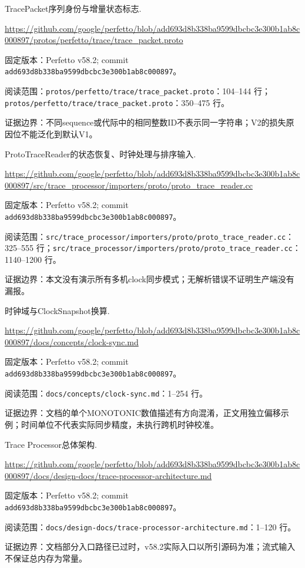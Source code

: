 \documentclass[UTF8,fontset=fandol,openany,11pt]{ctexbook}
\begin{document}
\begin{thebibliography}{999}
 TracePacket序列身份与增量状态标志.\par
\url{https://github.com/google/perfetto/blob/add693d8b338ba9599dbcbc3e300b1ab8c000897/protos/perfetto/trace/trace_packet.proto}\par
{\small\raggedright 固定版本：Perfetto v58.2; commit \texttt{add693d8\allowbreak{}b338ba95\allowbreak{}99dbcbc3\allowbreak{}e300b1ab\allowbreak{}8c000897}。\par
阅读范围：\nolinkurl{protos/perfetto/trace/trace_packet.proto}：104–144 行；\nolinkurl{protos/perfetto/trace/trace_packet.proto}：350–475 行。\par
证据边界：不同sequence或代际中的相同整数ID不表示同一字符串；V2的损失原因位不能泛化到默认V1。
}

 ProtoTraceReader的状态恢复、时钟处理与排序输入.\par
\url{https://github.com/google/perfetto/blob/add693d8b338ba9599dbcbc3e300b1ab8c000897/src/trace_processor/importers/proto/proto_trace_reader.cc}\par
{\small\raggedright 固定版本：Perfetto v58.2; commit \texttt{add693d8\allowbreak{}b338ba95\allowbreak{}99dbcbc3\allowbreak{}e300b1ab\allowbreak{}8c000897}。\par
阅读范围：\nolinkurl{src/trace_processor/importers/proto/proto_trace_reader.cc}：325–555 行；\nolinkurl{src/trace_processor/importers/proto/proto_trace_reader.cc}：1140–1200 行。\par
证据边界：本文没有演示所有多机clock同步模式；无解析错误不证明生产端没有漏报。
}

 时钟域与ClockSnapshot换算.\par
\url{https://github.com/google/perfetto/blob/add693d8b338ba9599dbcbc3e300b1ab8c000897/docs/concepts/clock-sync.md}\par
{\small\raggedright 固定版本：Perfetto v58.2; commit \texttt{add693d8\allowbreak{}b338ba95\allowbreak{}99dbcbc3\allowbreak{}e300b1ab\allowbreak{}8c000897}。\par
阅读范围：\nolinkurl{docs/concepts/clock-sync.md}：1–254 行。\par
证据边界：文档的单个MONOTONIC数值描述有方向混淆，正文用独立偏移示例；时间单位不代表实际同步精度，未执行跨机时钟校准。
}

 Trace Processor总体架构.\par
\url{https://github.com/google/perfetto/blob/add693d8b338ba9599dbcbc3e300b1ab8c000897/docs/design-docs/trace-processor-architecture.md}\par
{\small\raggedright 固定版本：Perfetto v58.2; commit \texttt{add693d8\allowbreak{}b338ba95\allowbreak{}99dbcbc3\allowbreak{}e300b1ab\allowbreak{}8c000897}。\par
阅读范围：\nolinkurl{docs/design-docs/trace-processor-architecture.md}：1–120 行。\par
证据边界：文档部分入口路径已过时，v58.2实际入口以所引源码为准；流式输入不保证总内存为常量。
}


\end{thebibliography}
\end{document}
